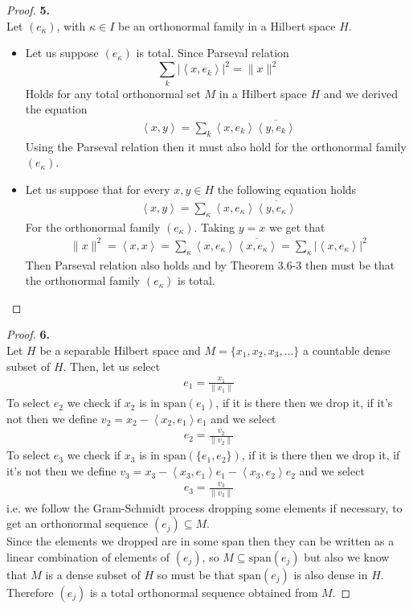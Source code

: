 \documentclass[11pt]{article}
\newcommand{\inprd}[1]{\left\langle{#1}\right\rangle}
\newcommand{\Span}[1]{\text{span}(#1)}
\theoremstyle{definition}
\begin{document}
\cleardoublepage
\begin{proof}{\textbf{5.}}\\
Let $(e_\kappa)$, with $\kappa \in I$ be an orthonormal family in a Hilbert
space $H$.
\begin{itemize}
\item [$(\Rightarrow)$] Let us suppose $(e_\kappa)$ is total.
Since Parseval relation
$$\sum_k |\inprd{x,e_k}|^2 = \|x\|^2$$
Holds for any total orthonormal set $M$ in a Hilbert space $H$ and we derived 
the equation 
\begin{align*}
    \inprd{x,y} = \sum_k\inprd{x,e_k}\overline{\inprd{y,e_k}}
\end{align*}
Using the Parseval relation then it must also hold for the orthonormal family
$(e_\kappa)$.
\item [$(\Leftarrow)$] Let us suppose that for every $x,y \in H$ the following 
equation holds
\begin{align*}
    \inprd{x,y} = \sum_\kappa\inprd{x,e_\kappa}\overline{\inprd{y,e_\kappa}}
\end{align*}
For the orthonormal family $(e_\kappa)$. Taking $y = x$ we get that 
\begin{align*}
    \|x\|^2 = \inprd{x,x}
    = \sum_\kappa\inprd{x,e_\kappa}\overline{\inprd{x,e_\kappa}}
    = \sum_\kappa |\inprd{x,e_\kappa}|^2
\end{align*}
Then Parseval relation also holds and by Theorem 3.6-3 then must be that
the orthonormal family $(e_\kappa)$ is total.
\end{itemize}
\end{proof}

\cleardoublepage
\begin{proof}{\textbf{6.}}\\
Let $H$ be a separable Hilbert space and $M = \{x_1, x_2, x_3, ...\}$ a
countable dense subset of $H$.
Then, let us select
\begin{align*}
    e_1 = \frac{x_1}{\|x_1\|}
\end{align*}
To select $e_2$ we check if $x_2$ is in $\Span{e_1}$, if it is there then we
drop it, if it's not then we define $v_2 = x_2 - \inprd{x_2, e_1} e_1$
and we select
\begin{align*}
    e_2 = \frac{v_2}{\|v_2\|}
\end{align*}
To select $e_3$ we check if $x_3$ is in $\Span{\{e_1, e_2\}}$, if it is there
then we drop it, if it's not then we define
$v_3 = x_3 - \inprd{x_3, e_1} e_1 - \inprd{x_3, e_2} e_2$
and we select
\begin{align*}
    e_3 = \frac{v_3}{\|v_3\|}
\end{align*}
i.e. we follow the Gram-Schmidt process dropping some elements if necessary, to
get an orthonormal sequence $(e_j) \subseteq M$.
\\
Since the elements we dropped are in some span then they can be written as a
linear combination of elements of $(e_j)$, so $M \subseteq \Span{e_j}$
but also we know that $M$ is a dense subset of $H$ so must be that $\Span{e_j}$
is also dense in $H$.
\\
Therefore $(e_j)$ is a total orthonormal sequence obtained from $M$.
\end{proof}
\end{document}
